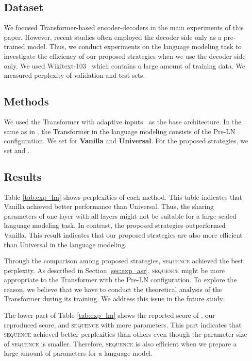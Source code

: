 \documentclass[11pt]{article}
\begin{document}
\subsection{Dataset}
We focused Transformer-based encoder-decoders in the main experiments of this paper.
However, recent studies often employed the decoder side only as a pre-trained model.
Thus, we conduct experiments on the language modeling task to investigate the efficiency of our proposed strategies when we use the decoder side only.
We used Wikitext-103~\cite{DBLP:journals/corr/MerityXBS16} which contains a large amount of training data.
We measured perplexity of validation and test sets.


\subsection{Methods}
We used the Transformer with adaptive inputs~\cite{DBLP:journals/corr/abs-1809-10853} as the base architecture.
In the same as in , the Transformer in the language modeling consists of the Pre-LN configuration.
We set  for \textbf{Vanilla} and \textbf{Universal}.
For the proposed strategies, we set  and .

\subsection{Results}
Table \ref{tab:exp_lm} shows perplexities of each method.
This table indicates that Vanilla achieved better performance than Universal.
Thus, the sharing parameters of one layer with all layers might not be suitable for a large-scaled language modeling task.
In contrast, the proposed strategies outperformed Vanilla.
This result indicates that our proposed strategies are also more efficient than Universal in the language modeling.


Through the comparison among proposed strategies, \textsc{sequence} achieved the best perplexity.
As described in Section \ref{sec:exp_asr}, \textsc{sequence} might be more appropriate to the Transformer with the Pre-LN configuration.
To explore the reason, we believe that we have to conduct the theoretical analysis of the Transformer during its training.
We address this issue in the future study.

The lower part of Table \ref{tab:exp_lm} shows the reported score of , our reproduced score, and \textsc{sequence} with more parameters.
This part indicates that \textsc{sequence} achieved better perplexities than others even though the parameter size of \textsc{sequence} is smaller.
Therefore, \textsc{sequence} is also efficient when we prepare a large amount of parameters for a language model.
\end{document}
